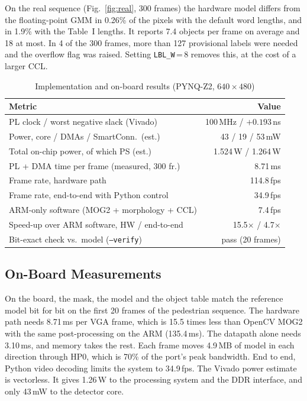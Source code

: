 \documentclass[conference]{IEEEtran}
\begin{document}
On the real sequence (Fig.~\ref{fig:real}, 300 frames) the hardware model differs
from the floating-point GMM in 0.26\% of the pixels with the default word
lengths, and in 1.9\% with the Table~I lengths. It reports 7.4 objects per frame
on average and 18 at most. In 4 of the 300 frames, more than 127 provisional
labels were needed and the overflow flag was raised. Setting
\texttt{LBL\_W}\,=\,8 removes this, at the cost of a larger CCL.

\begin{table}[!t]
\caption{Implementation and on-board results (PYNQ-Z2, $640\times480$)}
\label{tab:board}
\centering
\begin{tabular}{@{}lr@{}}
\toprule
Metric & Value\\
\midrule
PL clock / worst negative slack (Vivado)     & 100\,MHz / $+0.193$\,ns\\
Power, core / DMAs / SmartConn.\ (est.)      & 43 / 19 / 53\,mW\\
Total on-chip power, of which PS (est.)      & 1.524\,W / 1.264\,W\\
PL + DMA time per frame (measured, 300 fr.)  & 8.71\,ms\\
Frame rate, hardware path                    & 114.8\,fps\\
Frame rate, end-to-end with Python control   & 34.9\,fps\\
ARM-only software (MOG2 + morphology + CCL)  & 7.4\,fps\\
Speed-up over ARM software, HW / end-to-end  & 15.5$\times$ / 4.7$\times$\\
Bit-exact check vs.\ model (\texttt{--verify}) & pass (20 frames)\\
\bottomrule
\end{tabular}
\end{table}

\subsection{On-Board Measurements}
On the board, the mask, the model and the object table match the reference
model bit for bit on the first 20 frames of the pedestrian sequence. The hardware
path needs 8.71\,ms per VGA frame, which is 15.5 times less than OpenCV MOG2 with
the same post-processing on the ARM (135.4\,ms). The datapath alone needs
3.10\,ms, and memory takes the rest. Each frame moves 4.9\,MB of model in each
direction through HP0, which is 70\% of the port's peak bandwidth. End to end,
Python video decoding limits the system to 34.9\,fps. The Vivado power estimate
is vectorless. It gives 1.26\,W to the processing system and the DDR interface,
and only 43\,mW to the detector core.
\end{document}
